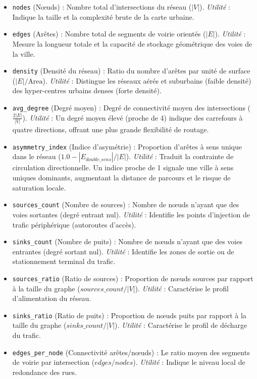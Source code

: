 \documentclass[10pt, a4paper]{article}
\providecommand{\tightlist}{}
\begin{document}
\begin{itemize}
\tightlist
\item
  \texttt{nodes} (Nœuds) : Nombre total d'intersections du réseau
  (\(|V|\)). \emph{Utilité} : Indique la taille et la complexité brute
  de la carte urbaine.
\item
  \texttt{edges} (Arêtes) : Nombre total de segments de voirie orientés
  (\(|E|\)). \emph{Utilité} : Mesure la longueur totale et la capacité
  de stockage géométrique des voies de la ville.
\item
  \texttt{density} (Densité du réseau) : Ratio du nombre d'arêtes par
  unité de surface (\(|E|/\text{Area}\)). \emph{Utilité} : Distingue les
  réseaux aérés et suburbains (faible densité) des hyper-centres urbains
  denses (forte densité).
\item
  \texttt{avg\_degree} (Degré moyen) : Degré de connectivité moyen des
  intersections (\(\frac{2|E|}{|V|}\)). \emph{Utilité} : Un degré moyen
  élevé (proche de 4) indique des carrefours à quatre directions,
  offrant une plus grande flexibilité de routage.
\item
  \texttt{asymmetry\_index} (Indice d'asymétrie) : Proportion d'arêtes à
  sens unique dans le réseau (\(1.0 - |E_{double\_sens}|/|E|\)).
  \emph{Utilité} : Traduit la contrainte de circulation directionnelle.
  Un indice proche de 1 signale une ville à sens uniques dominants,
  augmentant la distance de parcours et le risque de saturation locale.
\item
  \texttt{sources\_count} (Nombre de sources) : Nombre de nœuds n'ayant
  que des voies sortantes (degré entrant nul). \emph{Utilité} :
  Identifie les points d'injection de trafic périphérique (autoroutes
  d'accès).
\item
  \texttt{sinks\_count} (Nombre de puits) : Nombre de nœuds n'ayant que
  des voies entrantes (degré sortant nul). \emph{Utilité} : Identifie
  les zones de sortie ou de stationnement terminal du trafic.
\item
  \texttt{sources\_ratio} (Ratio de sources) : Proportion de nœuds
  sources par rapport à la taille du graphe (\(sources\_count/|V|\)).
  \emph{Utilité} : Caractérise le profil d'alimentation du réseau.
\item
  \texttt{sinks\_ratio} (Ratio de puits) : Proportion de nœuds puits par
  rapport à la taille du graphe (\(sinks\_count/|V|\)). \emph{Utilité} :
  Caractérise le profil de décharge du trafic.
\item
  \texttt{edges\_per\_node} (Connectivité arêtes/nœuds) : Le ratio moyen
  des segments de voirie par intersection (\(edges / nodes\)).
  \emph{Utilité} : Indique le niveau local de redondance des rues.
\end{itemize}
\end{document}
